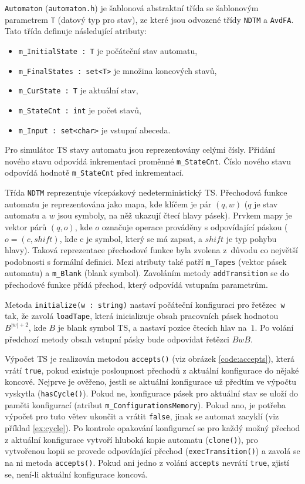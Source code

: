 \documentclass[thesis=B,czech]{FITthesis}[2019/12/23]
\theoremstyle{definition}
\begin{document}
\texttt{Automaton} (\texttt{automaton.h}) je šablonová abstraktní třída se šablonovým parametrem \texttt{T} (datový typ pro stav), ze které jsou odvozené třídy \texttt{NDTM} a \texttt{AvdFA}. Tato třída definuje následující atributy: 
\begin{itemize} 
	\item{\texttt{m\_InitialState : T} je počáteční stav automatu,}
	\item{\texttt{m\_FinalStates : set<T>} je množina koncových stavů,}
	\item{\texttt{m\_CurState : T} je aktuální stav,}
	\item{\texttt{m\_StateCnt : int} je počet stavů,}
	\item{\texttt{m\_Input : set<char>} je vstupní abeceda.}
\end{itemize}
Pro simulátor TS stavy automatu jsou reprezentovány celými čísly. Přidání nového stavu odpovídá inkrementaci proměnné \texttt{m\_StateCnt}. Číslo nového stavu odpovídá hodnotě \texttt{m\_StateCnt} před inkrementací.

Třída \texttt{NDTM} reprezentuje vícepáskový nedeterministický TS. Přechodová funkce automatu je reprezentována jako mapa, kde klíčem je pár $(q, w)$ ($q$ je stav automatu a $w$ jsou symboly, na něž ukazují čtecí hlavy pásek). Prvkem mapy je vektor párů $(q, o)$, kde $o$ označuje operace prováděny s odpovídající páskou ($o = (c, shift)$, kde c je symbol, který se má zapsat, a $shift$ je typ pohybu hlavy). Taková reprezentace přechodové funkce byla zvolena z~důvodu co největší podobnosti s formální definici. Mezi atributy také patří \texttt{m\_Tapes} (vektor pásek automatu) a \texttt{m\_Blank} (blank symbol). Zavoláním metody \texttt{addTransition} se do přechodové funkce přídá přechod, který odpovídá vstupním parametrům.

Metoda \texttt{initialize(w : string)} nastaví počáteční konfiguraci pro řetězec~\texttt{w} tak, že zavolá \texttt{loadTape}, která inicializuje obsah pracovních pásek hodnotou $B^{|w|+2}$, kde $B$ je blank symbol TS, a nastaví pozice čtecích hlav na~$1$. Po volání předchozí metody obsah vstupní pásky bude odpovídat řetězci $BwB$. 

Výpočet TS je realizován metodou \texttt{accepts()} (viz obrázek \ref{code:accepts}), která vrátí \texttt{true}, pokud existuje posloupnost přechodů z aktuální konfigurace do nějaké koncové. Nejprve je ověřeno, jestli se aktuální konfigurace už předtím ve výpočtu vyskytla (\texttt{hasCycle()}). Pokud ne, konfigurace pásek pro aktuální stav se uloží do paměti konfigurací (atribut \texttt{m\_ConfigurationsMemory}). Pokud ano, je potřeba výpočet pro tuto větev ukončit a vrátit \texttt{false}, jinak se automat zacyklí (viz příklad \ref{ex:cycle}). Po kontrole opakování konfigurací se pro každý možný přechod z aktuální konfigurace vytvoří hluboká kopie automatu (\texttt{clone()}), pro vytvořenou kopii se provede odpovídající přechod (\texttt{execTransition()}) a zavolá se na ni metoda \texttt{accepts()}. Pokud ani jedno z volání \texttt{accepts} nevrátí \texttt{true}, zjistí se, není-li aktuální konfigurace koncová. 
\end{document}
